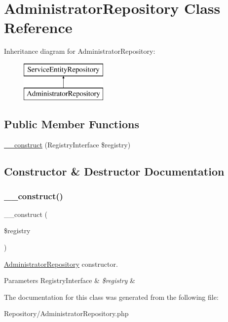\hypertarget{class_app_1_1_repository_1_1_administrator_repository}{}\section{Administrator\+Repository Class Reference}
\label{class_app_1_1_repository_1_1_administrator_repository}
Inheritance diagram for Administrator\+Repository\+:\begin{figure}[H]
\begin{center}
\leavevmode
\includegraphics[height=2.000000cm]{class_app_1_1_repository_1_1_administrator_repository}
\end{center}
\end{figure}
\subsection*{Public Member Functions}
\begin{DoxyCompactItemize}
\item 
\mbox{\hyperlink{class_app_1_1_repository_1_1_administrator_repository_aadca7edd263e228921a1860bb6b9c252}{\+\_\+\+\_\+construct}} (Registry\+Interface \$registry)
\end{DoxyCompactItemize}


\subsection{Constructor \& Destructor Documentation}
\mbox{\label{class_app_1_1_repository_1_1_administrator_repository_aadca7edd263e228921a1860bb6b9c252}} 
\subsubsection{\texorpdfstring{\_\_construct()}{\_\_construct()}}
{\footnotesize\ttfamily \+\_\+\+\_\+construct (\begin{DoxyParamCaption}\item[{Registry\+Interface}]{\$registry }\end{DoxyParamCaption})}

\mbox{\hyperlink{class_app_1_1_repository_1_1_administrator_repository}{Administrator\+Repository}} constructor. 
\begin{DoxyParams}[1]{Parameters}
Registry\+Interface & {\em \$registry} & \\
\hline
\end{DoxyParams}


The documentation for this class was generated from the following file\+:\begin{DoxyCompactItemize}
\item 
Repository/Administrator\+Repository.\+php\end{DoxyCompactItemize}
